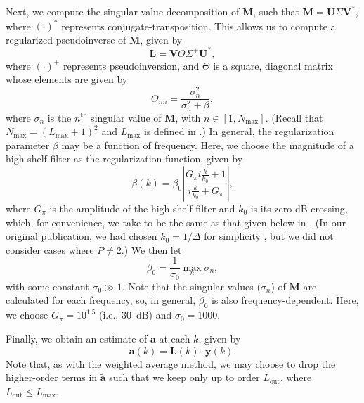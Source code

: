 Next, we compute the singular value decomposition of $\mathbf{M}$, such that $\mathbf{M} = \mathbf{U} \Sigma \mathbf{V}^*$, where $(\cdot)^*$ represents conjugate-transposition.
This allows us to compute a regularized pseudoinverse of $\mathbf{M}$, given by \citep[section 5.1]{Hansen1998}
\begin{equation}
\mathbf{L} = \mathbf{V} \Theta \Sigma^{+} \mathbf{U}^*,
\end{equation}
where $(\cdot)^+$ represents pseudoinversion, and $\Theta$ is a square, diagonal matrix whose elements are given by
\begin{equation}
\Theta_{nn} = \frac{\sigma_n^2}{\sigma_n^2 + \beta},
\end{equation}
where $\sigma_n$ is the $n^\textrm{th}$ singular value of $\mathbf{M}$, with $n \in [1,N_\textrm{max}]$.
(Recall that $N_\textrm{max} = (L_\textrm{max} + 1)^2$ and $L_\textrm{max}$ is defined in .)
In general, the regularization parameter $\beta$ may be a function of frequency.
Here, we choose the magnitude of a high-shelf filter as the regularization function, given by \citep[section 5.2]{Zolzer2008}
\begin{equation}
\beta(k) = \beta_0 \left| \frac{G_{\pi} i \frac{k}{k_0} + 1}{i \frac{k}{k_0} + G_{\pi}} \right|,
\end{equation}
where $G_{\pi}$ is the amplitude of the high-shelf filter and $k_0$ is its zero-dB crossing, which, for convenience, we take to be the same as that given below in .
(In our original publication, we had chosen $k_0 = 1 / \Delta$ for simplicity \citep[Eq.~(17)]{TylkaChoueiri2016}, but we did not consider cases where $P \neq 2$.)
We then let
\begin{equation}
\beta_0 = \frac{1}{\sigma_0} \max_n \sigma_n,
\end{equation}
with some constant $\sigma_0 \gg 1$.
Note that the singular values ($\sigma_n$) of $\mathbf{M}$ are calculated for each frequency, so, in general, $\beta_0$ is also frequency-dependent.
Here, we choose $G_{\pi} = 10^{1.5}$ (i.e., 30~dB) and $\sigma_0 = 1000$.

Finally, we obtain an estimate of $\mathbf{a}$ at each $k$, given by
\begin{equation}
\mathbf{\tilde{a}}(k) = \mathbf{L}(k) \cdot \mathbf{y}(k).
\end{equation}
Note that, as with the weighted average method, we may choose to drop the higher-order terms in $\mathbf{\tilde{a}}$ such that we keep only up to order $L_\textrm{out}$, where $L_\textrm{out} \leq L_\textrm{max}$.

